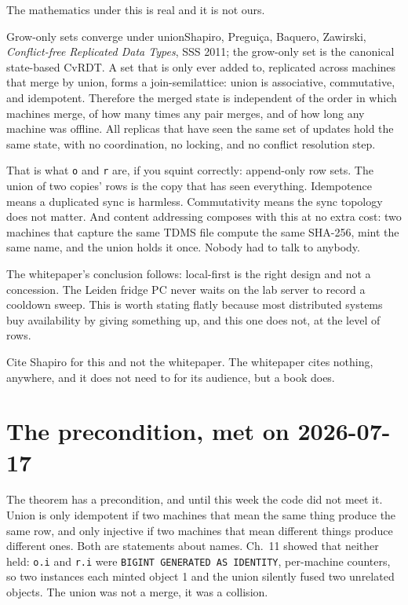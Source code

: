 The mathematics under this is real and it is not ours.

\begin{Theorem}{Grow-only sets converge under union}{Shapiro, Preguiça, Baquero, Zawirski, \emph{Conflict-free Replicated Data Types}, SSS 2011; the grow-only set is the canonical state-based CvRDT.}
A set that is only ever added to, replicated across machines that merge by union, forms a join-semilattice: union is associative, commutative, and idempotent. Therefore the merged state is independent of the order in which machines merge, of how many times any pair merges, and of how long any machine was offline. All replicas that have seen the same set of updates hold the same state, with no coordination, no locking, and no conflict resolution step.
\end{Theorem}

That is what \texttt{o} and \texttt{r} are, if you squint correctly: append-only row sets. The union of two copies' rows is the copy that has seen everything. Idempotence means a duplicated sync is harmless. Commutativity means the sync topology does not matter. And content addressing composes with this at no extra cost: two machines that capture the same TDMS file compute the same SHA-256, mint the same name, and the union holds it once. Nobody had to talk to anybody.

The whitepaper's conclusion follows:  local-first is the right design and not a concession. The Leiden fridge PC never waits on the lab server to record a cooldown sweep. This is worth stating flatly because most distributed systems buy availability by giving something up, and this one does not, at the level of rows.

Cite Shapiro for this and not the whitepaper. The whitepaper cites nothing, anywhere, and it does not need to for its audience, but a book does.

\section{The precondition, met on 2026-07-17}

The theorem has a precondition, and until this week the code did not meet it. Union is only idempotent if two machines that mean the same thing produce the same row, and only injective if two machines that mean different things produce different ones. Both are statements about names. Ch.~11 showed that neither held: \texttt{o.i} and \texttt{r.i} were \texttt{BIGINT GENERATED AS IDENTITY}, per-machine counters, so two instances each minted object 1 and the union silently fused two unrelated objects. The union was not a merge, it was a collision.


